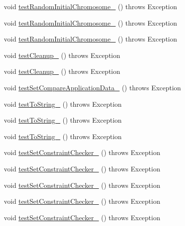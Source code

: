 \begin{DoxyCompactItemize}
void \hyperlink{classorg_1_1jgap_1_1_chromosome_test_a1400006f36eccf4a73be2c577a5e88fb}{test\-Random\-Initial\-Chromosome\-\_} ()  throws Exception 
\item 
void \hyperlink{classorg_1_1jgap_1_1_chromosome_test_adc45f0550aa041be3478e865ac29bd95}{test\-Random\-Initial\-Chromosome\-\_} ()  throws Exception 
\item 
void \hyperlink{classorg_1_1jgap_1_1_chromosome_test_a7da4e9f8ee8166bf9dd3cc8e0b0a7a09}{test\-Random\-Initial\-Chromosome\-\_} ()  throws Exception 
\item 
void \hyperlink{classorg_1_1jgap_1_1_chromosome_test_aad4f09973af03f5e7a70acdcc16982c1}{test\-Cleanup\-\_} ()  throws Exception 
\item 
void \hyperlink{classorg_1_1jgap_1_1_chromosome_test_aa27a6f8191c6e8f0eeaaa69a599882c1}{test\-Cleanup\-\_} ()  throws Exception 
\item 
void \hyperlink{classorg_1_1jgap_1_1_chromosome_test_ab6ee639400035944f42a46b3ebae7cbf}{test\-Set\-Compare\-Application\-Data\-\_} ()  throws Exception 
\item 
void \hyperlink{classorg_1_1jgap_1_1_chromosome_test_aafb800406349ad224896138f5ce5cc38}{test\-To\-String\-\_} ()  throws Exception 
\item 
void \hyperlink{classorg_1_1jgap_1_1_chromosome_test_ab9a15688031e9be3bdb1c336df04d1b9}{test\-To\-String\-\_} ()  throws Exception 
\item 
void \hyperlink{classorg_1_1jgap_1_1_chromosome_test_ae2b8d323c03b12da879bcaa6166909be}{test\-To\-String\-\_} ()  throws Exception 
\item 
void \hyperlink{classorg_1_1jgap_1_1_chromosome_test_a6f6896fcdac1ebefd78f43486cefc7e6}{test\-Set\-Constraint\-Checker\-\_} ()  throws Exception 
\item 
void \hyperlink{classorg_1_1jgap_1_1_chromosome_test_a43769965500bcf0a6cc6e4fad179642b}{test\-Set\-Constraint\-Checker\-\_} ()  throws Exception 
\item 
void \hyperlink{classorg_1_1jgap_1_1_chromosome_test_a60e6166405faff97542095c89be9ad08}{test\-Set\-Constraint\-Checker\-\_} ()  throws Exception 
\item 
void \hyperlink{classorg_1_1jgap_1_1_chromosome_test_a59ee4ec66e945e8607e459f379635d2b}{test\-Set\-Constraint\-Checker\-\_} ()  throws Exception 
\item 
void \hyperlink{classorg_1_1jgap_1_1_chromosome_test_a70de70db91ccc9d02f6a85f5e438189c}{test\-Set\-Constraint\-Checker\-\_} ()  throws Exception 

\end{DoxyCompactItemize}
